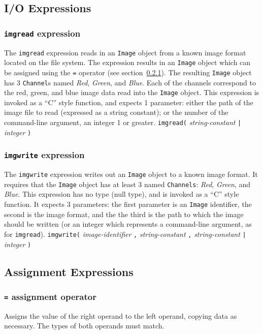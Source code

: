 \subsection{I/O Expressions}

\subsubsection{\texttt{imgread} expression}
\label{sssec:imgread}
The \texttt{imgread} expression reads in an \texttt{Image} object from
a known image format located on the file system. The expression results
in an \texttt{Image} object which can be assigned using the \texttt{=}
operator (see section~\ref{sssec:equalop}). The resulting \texttt{Image}
object has 3 \texttt{Channel}s named \emph{Red}, \emph{Green}, and
\emph{Blue}. Each of the channels correspond to the red, green, and blue
image data read into the \texttt{Image} object. This expression is invoked
as a ``C'' style function, and expects 1 parameter: either the path of the
image file to read (expressed as a string constant); or the number of the
command-line argument, an integer 1 or greater.
\startsyn
\texttt{imgread(} \emph{string-constant} \texttt{|} \emph{integer} \texttt{)}
\stopsyn

\subsubsection{\texttt{imgwrite} expression}
\label{sssec:imgwrite}
The \texttt{imgwrite} expression writes out an \texttt{Image} object to a known
image format. It requires that the \texttt{Image} object has at least 3 named
\texttt{Channels}: \emph{Red}, \emph{Green}, and \emph{Blue}.
This expression has no type (null type), and is invoked as a ``C'' style function.
It expects 3 parameters: the first parameter is an \texttt{Image} identifier, the
second is the image format, and the the third is the path to which the image
should be written (or an integer which represents a command-line argument, as for
\texttt{imgread}).
\startsyn
\texttt{imgwrite(} \emph{image-identifier} \texttt{,} \emph{string-constant} \texttt{,} \emph{string-constant} \texttt{|} \emph{integer} \texttt{)}
\stopsyn

\subsection{Assignment Expressions}
\label{ssec:assignment}

\subsubsection{\texttt{=} assignment operator}
\label{sssec:equalop}
Assigns the value of the right operand to the left operand, copying data as necessary.
The types of both operands must match.

